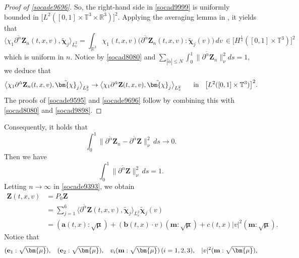 \documentclass[reqno]{amsart}
\numberwithin{equation}{section}
\numberwithin{equation}{section}
\begin{document}
\begin{proof}[Proof of \eqref{socade9696}]
		So, the right-hand side in \eqref{socad9999} is uniformly bounded in $\big[L^{2}([0, 1] \times \mathbb{T}^{3} \times \mathbb{R}^{3})\big]^2$. Applying the averaging lemma in \cite{avrlem}, it yields that
		$$
		\big\langle \chi_{1}\partial^{\tilde{\alpha}} \mathbf{Z}_{n}(t, x, v), \tilde{\bm{\chi}}_j \big\rangle_{L^{2}_{v}} = \int_{\mathbb{R}^{3}} \chi_{1}(t, x, v)\big(\partial^{\tilde{\alpha}} \mathbf{Z}_{n}(t, x, v):\tilde{\bm{\chi}}_j(v)\big)\, dv \,\in \big[H^{\frac{1}{4}}([0, 1] \times \mathbb{T}^{3})\big]^2
		$$
		which is uniform in $n$. Notice by \eqref{socad8080} and $\sum_{|\tilde{\alpha}| \leq N} \int_{0}^{1} \|\partial^{\tilde{\alpha}} \mathbf{Z}_{n}\|_{\nu}^{2} ds = 1$,  we deduce that
		$$
		\big\langle \chi_{1}\partial^{\tilde{\alpha}} \mathbf{Z}_{n}(t, x, v), \tilde{\bm{\chi}}_j \big\rangle_{L^{2}_{v}} \to \big\langle \chi_{1}\partial^{\tilde{\alpha}} \mathbf{Z}(t, x, v), \tilde{\bm{\chi}}_j \big\rangle_{L^{2}_{v}} \hspace{0.5cm} \text{ in }\hspace{0.2cm} \big[L^{2}([0, 1] \times \mathbb{T}^{3})\big]^{2}.
		$$
		The proofs of \eqref{socade9595} and \eqref{socade9696} follow by combining this with \eqref{socad8080} and \eqref{socad9898}. 
		\end{proof} 
		Consequently, it holds that
		$$
		\int_{0}^{1} \|\partial^{\tilde{\alpha}} \mathbf{Z}_{n} - \partial^{\tilde{\alpha}} \mathbf{Z}\|_{\nu}^{2}\, ds \to 0.
		$$
		Then we have
		\begin{equation}
		\int_{0}^{1} \|\partial^{\tilde{\alpha}} \mathbf{Z}\|_{\nu}^{2}\, ds = 1. \label{socaed100100}
		\end{equation}
		Letting $ n \to \infty $ in \eqref{socade9393}, we obtain
		$$
		\begin{aligned}
			\mathbf{Z}(t,x,v) &= P_0 \mathbf{Z} \\
			&= \sum_{j=1}^6 \big\langle \partial^{\tilde{\alpha}} \mathbf{Z}(t,x,v), \tilde{\bm{\chi}}_j \big\rangle_{L^{2}_{v}} \tilde{\bm{\chi}}_j(v) \\
			&= (\mathbf{a}(t,x):\sqrt{\bm{\mu}}) + (\mathbf{b}(t,x) \cdot v) (\mathbf{m}:\sqrt{\bm{\mu}}) + c(t,x)|v|^2(\mathbf{m}:\sqrt{\bm{\mu}}).
		\end{aligned}
		$$
		Notice that
		\begin{equation*}
			(\mathbf{e}_1:\sqrt{\bm{\mu}}),\hspace{0.3cm} (\mathbf{e}_2:\sqrt{\bm{\mu}}),\hspace{0.3cm} v_i(\mathbf{m}:\sqrt{\bm{\mu}})\,(i=1,2,3), \hspace{0.3cm} |v|^2(\mathbf{m}:\sqrt{\bm{\mu}}),
		\end{equation*}
\end{document}
